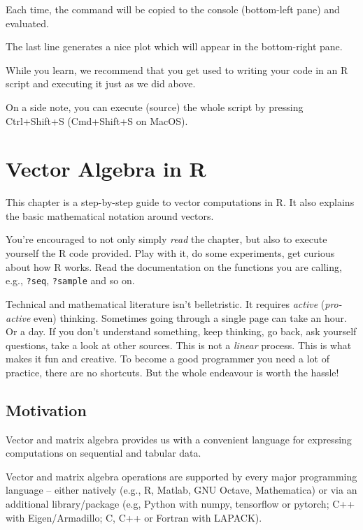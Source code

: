 \documentclass[10pt,b5paper,krantz1]{krantz}
\begin{document}
\begin{enumerate}
  Each time, the command will be copied to the console
  (bottom-left pane)
  and evaluated.

  The last line generates a nice plot which will appear in the
  bottom-right pane.
\end{enumerate}

While you learn, we recommend that you get used to writing your
code in an R script and executing it just as we did above.

On a side note, you can execute (source) the whole script
by pressing Ctrl+Shift+S (Cmd+Shift+S on MacOS).

\hypertarget{vector-algebra-in-r}{%
\chapter{Vector Algebra in R}\label{vector-algebra-in-r}}

This chapter is a step-by-step guide to vector computations in R.
It also explains the basic mathematical notation around vectors.

You're encouraged to not only simply \emph{read} the chapter,
but also to execute yourself the R code provided.
Play with it, do some experiments, get curious about
how R works. Read the documentation on the functions you are calling,
e.g., \texttt{?seq}, \texttt{?sample} and so on.

Technical and mathematical literature isn't belletristic.
It requires \emph{active} (\emph{pro-active} even) thinking.
Sometimes going through a single page can take an hour. Or a day.
If you don't understand something, keep thinking, go back, ask yourself
questions, take a look at other sources. This is not a \emph{linear} process.
This is what makes it fun and creative.
To become a good programmer you need a lot of practice, there
are no shortcuts. But the whole endeavour is worth the hassle!

\hypertarget{motivation-1}{%
\section{Motivation}\label{motivation-1}}

Vector and matrix algebra provides us with a convenient language for
expressing computations on sequential and tabular data.

Vector and matrix algebra operations are supported by every
major programming language -- either natively
(e.g., R, Matlab, GNU Octave, Mathematica)
or via an additional library/package
(e.g, Python with numpy, tensorflow or pytorch;
C++ with Eigen/Armadillo; C, C++ or Fortran with LAPACK).
\end{document}
